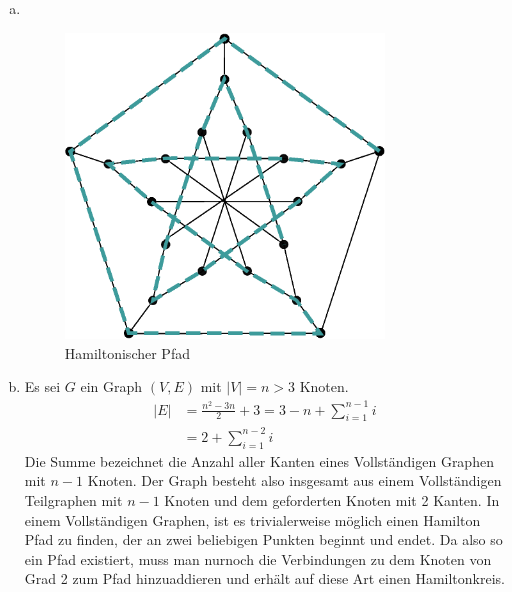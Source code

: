 \documentclass[11pt]{article}
\newcommand{\abs}[1]{\left| #1 \right| }
\begin{document}
\begin{enumerate}[a)]
  \item  $ $
    \begin{figure}[h!]
      \centering
      \includegraphics[width=0.8\textwidth]{hamilton_graph}
      \caption{Hamiltonischer Pfad}
      \label{fig:hamilton_graph.eps}
    \end{figure}
  \item
    Es sei $G$ ein Graph $(V, E)$ mit $\abs{V} = n>3$ Knoten.
    \begin{align*}
      |E| & =\frac{n^2 - 3n}{2} + 3 = 3 - n + \sum_{i=1}^{n-1} i \\
          & = 2  + \sum_{i=1}^{n-2} i
    \end{align*}
    Die Summe bezeichnet die Anzahl aller Kanten eines Vollst\"andigen 
    Graphen mit $n-1$ Knoten. Der Graph besteht also insgesamt aus einem 
    Vollst\"andigen Teilgraphen mit $n-1$ Knoten und dem geforderten Knoten
    mit 2 Kanten. In einem Vollst\"andigen Graphen, ist es trivialerweise
    m\"oglich einen Hamilton Pfad zu finden, der an zwei beliebigen 
    Punkten beginnt und endet. Da also so ein Pfad existiert, muss man
    nurnoch die Verbindungen zu dem Knoten von Grad 2 zum Pfad hinzuaddieren
    und erh\"alt auf diese Art einen Hamiltonkreis.

\end{enumerate} 
\end{document}
